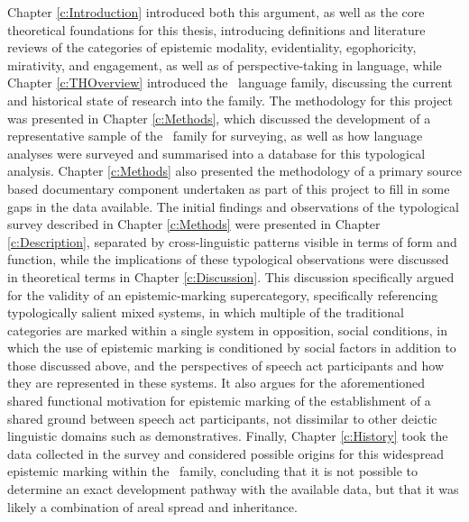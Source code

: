 Chapter \ref{c:Introduction} introduced both this argument, as well as the core theoretical foundations for this thesis, introducing definitions and literature reviews of the categories of epistemic modality, evidentiality, egophoricity, mirativity, and engagement, as well as of perspective-taking in language, while Chapter \ref{c:THOverview} introduced the \lfam\ language family, discussing the current and historical state of research into the family. The methodology for this project was presented in Chapter \ref{c:Methods}, which discussed the development of a representative sample of the \lfam\ family for surveying, as well as how language analyses were surveyed and summarised into a database for this typological analysis. Chapter \ref{c:Methods} also presented the methodology of a primary source based documentary component undertaken as part of this project to fill in some gaps in the data available. The initial findings and observations of the typological survey described in Chapter \ref{c:Methods} were presented in Chapter \ref{c:Description}, separated by cross-linguistic patterns visible in terms of form and function, while the implications of these typological observations were discussed in theoretical terms in Chapter \ref{c:Discussion}. This discussion specifically argued for the validity of an epistemic-marking supercategory, specifically referencing typologically salient mixed systems, in which multiple of the traditional categories are marked within a single system in opposition, social conditions, in which the use of epistemic marking is conditioned by social factors in addition to those discussed above, and the perspectives of speech act participants and how they are represented in these systems. It also argues for the aforementioned shared functional motivation for epistemic marking of the establishment of a shared ground between speech act participants, not dissimilar to other deictic linguistic domains such as demonstratives. Finally, Chapter \ref{c:History} took the data collected in the survey and considered possible origins for this widespread epistemic marking within the \lfam\ family, concluding that it is not possible to determine an exact development pathway with the available data, but that it was likely a combination of areal spread and inheritance.

